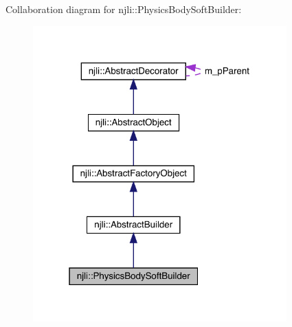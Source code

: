Collaboration diagram for njli\+:\+:Physics\+Body\+Soft\+Builder\+:\nopagebreak
\begin{figure}[H]
\begin{center}
\leavevmode
\includegraphics[width=277pt]{classnjli_1_1_physics_body_soft_builder__coll__graph}
\end{center}
\end{figure}
